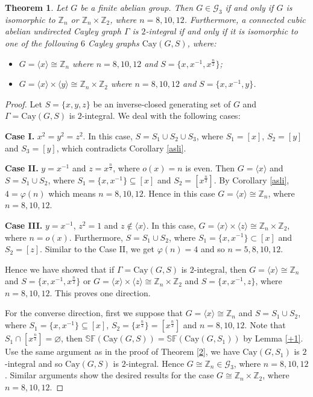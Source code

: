 \documentclass[12pt,a4paper]{article}
\newtheorem{thm}{Theorem}[section]
\begin{document}
	\begin{thm}\label{3}
		Let $G$ be a finite abelian group. Then $G\in\mathcal{G}_3$ if and only if $G$ is isomorphic to $\mathbb Z_n$ or $\mathbb Z_n\times\mathbb Z_2$, where $n=8,10,12$.
		Furthermore, a connected cubic abelian undirected Cayley graph $\Gamma$ is $2$-integral if and only if it is isomorphic to one of the  following $6$ Cayley graphs $\mathrm{Cay}(G,S)$, where:
		\begin{itemize}
			\item[$\romannumeral1$.] $G=\langle x\rangle \cong \mathbb{Z}_n$ where $n=8,10,12$ and $S=\{x,x^{-1},x^{\frac{n}{2}}\}$;
			\item[$\romannumeral2$.] $G=\langle x\rangle \times \langle y\rangle\cong \mathbb{Z}_n\times \mathbb{Z}_2$ where $n=8,10,12$ and $S=\{x,x^{-1},y\}$.
		\end{itemize}
	\end{thm}
	
	\begin{proof}
		Let $S=\{x,y,z\}$ be an inverse-closed generating set of $G$ and $\Gamma=\mathrm{Cay}(G,S)$ is $2$-integral. We deal with the following cases:
		
		\textbf{Case I.} $x^2=y^2=z^2$. In this case, $S=S_1\cup S_2\cup S_3$, where $S_1=[x]$, $S_2=[y]$ and $S_3=[y]$, which contradicts Corollary \ref{asli}.
		
		\textbf{Case II.} $y=x^{-1}$ and $z=x^{\frac{n}{2}}$, where $o(x)=n$ is even. Then $G=\langle x\rangle$ and $S=S_1\cup S_2$, where $S_1=\{x,x^{-1}\}\subseteq [x]$ and
		$S_2=[x^{\frac{n}{2}}]$. By Corollary \ref{asli}, $4=\varphi(n)$ which means $n=8,10,12$.
		Hence in this case $G=\langle x \rangle \cong \mathbb Z_n$, where $n=8,10,12$.
		
		\textbf{Case III.} $y=x^{-1}$, $z^2=1$ and $z\notin\langle x\rangle$. In this case, $G=\langle x\rangle\times\langle z\rangle\cong\mathbb Z_n\times\mathbb Z_2$, where $n=o(x)$. Furthermore, $S=S_1\cup S_2$, where $S_1=\{x,x^{-1}\}\subset [x]$ and $S_2=[z]$. Similar to the Case II, we get $\varphi(n)=4$ and so $n=5,8,10,12$.
		
		Hence we have showed that if $\Gamma=\mathrm{Cay}(G,S)$ is $2$-integral, then $G=\langle x\rangle \cong\mathbb Z_n$ and $S=\{x,x^{-1},x^{\frac{n}{2}}\}$ or $G=\langle x\rangle\times\langle z\rangle\cong\mathbb Z_n\times\mathbb Z_2$ and $S=\{x,x^{-1},z\}$, where $n=8,10,12$. This proves one direction. 
		
		For the converse direction, first we suppose that $G=\langle x\rangle \cong\mathbb Z_n$ and $S=S_1\cup S_2$, where $S_1=\{x,x^{-1}\}\subseteq [x]$, $S_2=\{x^{\frac{n}{2}}\}=[x^{\frac{n}{2}}]$ and $n=8,10,12$.
		Note that $S_1\cap [x^{\frac{n}{2}}]=\varnothing$, then $\mathbb{SF}(\mathrm{Cay}(G,S))=\mathbb{SF}(\mathrm{Cay}(G,S_1))$ by Lemma \ref{+1}.
		Use the same argument as in the proof of Theorem \ref{2}, we have $\mathrm{Cay}(G,S_1)$ is $2$-integral and so $\mathrm{Cay}(G,S)$ is $2$-integral. Hence $G\cong\mathbb Z_n\in \mathcal{G}_3$, where $n=8,10,12$.
		Similar arguments show the desired results for the case $G\cong\mathbb Z_n\times\mathbb Z_2$, where $n=8,10,12$. 
	\end{proof}
	
\end{document}
